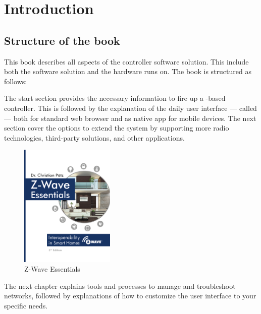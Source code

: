 \chapter{Introduction}
\label{cap1}


\section{Structure of the book}

This book describes all aspects of the \zway controller software solution. This include 
both the \zway software solution and the hardware \zway runs on. The book is structured as follows:

\vspace{10mm}
	{\fontsize{14}{16}\selectfont
	}
\vspace{10mm}

The start section provides the necessary information to fire up a \zway-based controller. 
This is followed by the explanation of the daily user interface --- called \zwshui ---
both for standard web browser and as native app for mobile devices. The next section cover 
the options to extend the system by supporting 
more radio technologies, third-party solutions, and other applications.

\begin{figure}
\begin{center}
\includegraphics[width=0.4\textwidth]{pngs/cap1/zwbook.png}
\caption{Z-Wave Essentials}
\label{zwbook}
\end{center}
\end{figure}

The next chapter explains tools and processes to manage and troubleshoot \zwave networks, 
followed by explanations of how to customize the user interface to your specific needs.

